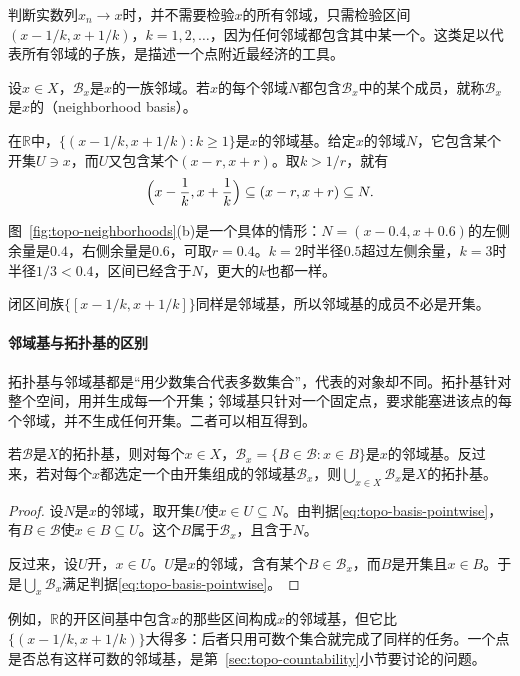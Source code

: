 判断实数列$x_n\to x$时，并不需要检验$x$的所有邻域，只需检验区间$(x-1/k,x+1/k)$，$k=1,2,\dots$，因为任何邻域都包含其中某一个。这类足以代表所有邻域的子族，是描述一个点附近最经济的工具。

\begin{definition}[邻域基]
\label{def:topo-neighborhood-basis}
设$x\in X$，$\mathcal B_x$是$x$的一族邻域。若$x$的每个邻域$N$都包含$\mathcal B_x$中的某个成员，就称$\mathcal B_x$是$x$的（neighborhood basis）。
\end{definition}

在$\mathbb R$中，$\{(x-1/k,x+1/k):k\geq1\}$是$x$的邻域基。给定$x$的邻域$N$，它包含某个开集$U\ni x$，而$U$又包含某个$(x-r,x+r)$。取$k>1/r$，就有
\[
 \Bigl(x-\frac1k,x+\frac1k\Bigr)\subseteq(x-r,x+r)\subseteq N.
\]

图~\ref{fig:topo-neighborhoods}(b)是一个具体的情形：$N=(x-0.4,x+0.6)$的左侧余量是$0.4$，右侧余量是$0.6$，可取$r=0.4$。$k=2$时半径$0.5$超过左侧余量，$k=3$时半径$1/3<0.4$，区间已经含于$N$，更大的$k$也都一样。

闭区间族$\{[x-1/k,x+1/k]\}$同样是邻域基，所以邻域基的成员不必是开集。

\paragraph{邻域基与拓扑基的区别}
拓扑基与邻域基都是“用少数集合代表多数集合”，代表的对象却不同。拓扑基针对整个空间，用并生成每一个开集；邻域基只针对一个固定点，要求能塞进该点的每个邻域，并不生成任何开集。二者可以相互得到。

\begin{lemma}[由拓扑基得到邻域基]
\label{lem:topo-basis-to-neighborhood-basis}
若$\mathcal B$是$X$的拓扑基，则对每个$x\in X$，$\mathcal B_x=\{B\in\mathcal B:x\in B\}$是$x$的邻域基。反过来，若对每个$x$都选定一个由开集组成的邻域基$\mathcal B_x$，则$\bigcup_{x\in X}\mathcal B_x$是$X$的拓扑基。
\end{lemma}
\begin{proof}
设$N$是$x$的邻域，取开集$U$使$x\in U\subseteq N$。由判据\eqref{eq:topo-basis-pointwise}，有$B\in\mathcal B$使$x\in B\subseteq U$。这个$B$属于$\mathcal B_x$，且含于$N$。

反过来，设$U$开，$x\in U$。$U$是$x$的邻域，含有某个$B\in\mathcal B_x$，而$B$是开集且$x\in B$。于是$\bigcup_x\mathcal B_x$满足判据\eqref{eq:topo-basis-pointwise}。
\end{proof}

例如，$\mathbb R$的开区间基中包含$x$的那些区间构成$x$的邻域基，但它比$\{(x-1/k,x+1/k)\}$大得多：后者只用可数个集合就完成了同样的任务。一个点是否总有这样可数的邻域基，是第~\ref{sec:topo-countability}小节要讨论的问题。
